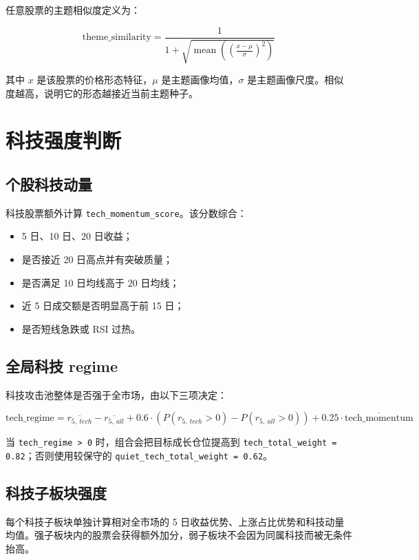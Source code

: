 \documentclass[UTF8,zihao=-4]{ctexart}
\begin{document}
任意股票的主题相似度定义为：

\[
\text{theme\_similarity} =
\frac{1}{1 + \sqrt{\operatorname{mean}\left(\left(\frac{x - \mu}{\sigma}\right)^2\right)}}
\]

其中 $x$ 是该股票的价格形态特征，$\mu$ 是主题画像均值，$\sigma$ 是主题画像尺度。相似度越高，说明它的形态越接近当前主题种子。

\section{科技强度判断}

\subsection{个股科技动量}

科技股票额外计算 \texttt{tech\_momentum\_score}。该分数综合：

\begin{itemize}
  \item 5 日、10 日、20 日收益；
  \item 是否接近 20 日高点并有突破质量；
  \item 是否满足 10 日均线高于 20 日均线；
  \item 近 5 日成交额是否明显高于前 15 日；
  \item 是否短线急跌或 RSI 过热。
\end{itemize}

\subsection{全局科技 regime}

科技攻击池整体是否强于全市场，由以下三项决定：

\[
\text{tech\_regime} =
\overline{r_{5,\ tech}} - \overline{r_{5,\ all}}
+ 0.6 \cdot \left(P(r_{5,\ tech}>0)-P(r_{5,\ all}>0)\right)
+ 0.25 \cdot \overline{\text{tech\_momentum}}
\]

当 \texttt{tech\_regime > 0} 时，组合会把目标成长仓位提高到 \texttt{tech\_total\_weight = 0.82}；否则使用较保守的 \texttt{quiet\_tech\_total\_weight = 0.62}。

\subsection{科技子板块强度}

每个科技子板块单独计算相对全市场的 5 日收益优势、上涨占比优势和科技动量均值。强子板块内的股票会获得额外加分，弱子板块不会因为同属科技而被无条件抬高。
\end{document}
